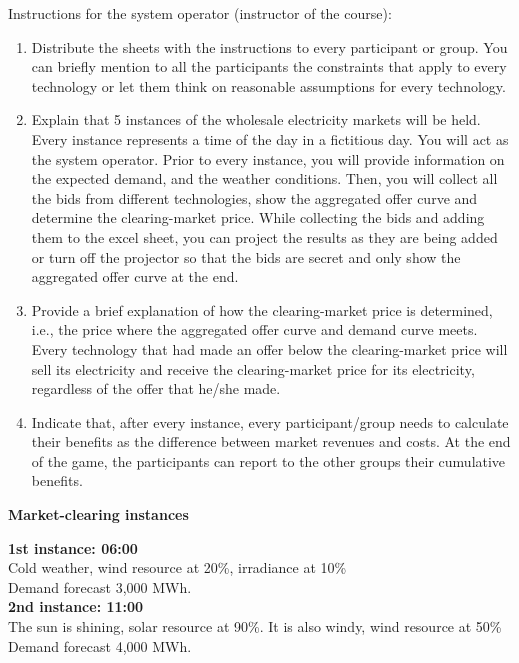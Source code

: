 \documentclass[3p]{elsarticle} %
\begin{document}
Instructions for the system operator (instructor of the course):

\begin{enumerate}

\item Distribute the sheets with the instructions to every participant or group. You can briefly mention to all the participants the constraints that apply to every technology or let them think on reasonable assumptions for every technology. 

\item	Explain that 5 instances of the wholesale electricity markets will be held. Every instance represents a time of the day in a fictitious day. You will act as the system operator. Prior to every instance, you will provide information on the expected demand, and the weather conditions. Then, you will collect all the bids from different technologies, show the aggregated offer curve and determine the clearing-market price. While collecting the bids and adding them to the excel sheet, you can project the results as they are being added or turn off the projector so that the bids are secret and only show the aggregated offer curve at the end. 

\item Provide a brief explanation of how the clearing-market price is determined, i.e., the price where the aggregated offer curve and demand curve meets. Every technology that had made an offer below the clearing-market price will sell its electricity and receive the clearing-market price for its electricity, regardless of the offer that he/she made. 

\item	Indicate that, after every instance, every participant/group needs to calculate their benefits as the difference between market revenues and costs.  At the end of the game, the participants can report to the other groups their cumulative benefits. 

\end{enumerate}

\textbf{Market-clearing instances}

\textbf{1st instance: 06:00} \\
Cold weather, wind resource at 20\%, irradiance at 10\% \\
Demand forecast 3,000 MWh. \\

\textbf{2nd instance: 11:00} \\
The sun is shining, solar resource at 90\%. It is also windy, wind resource at 50\% \\
Demand forecast 4,000 MWh. \\
\end{document}
